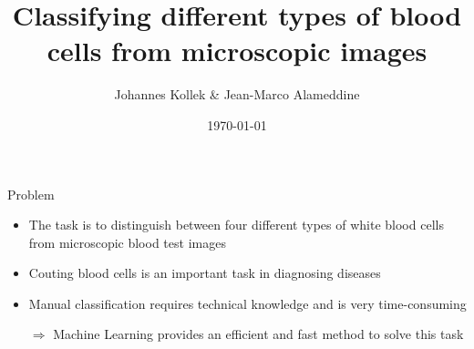 \documentclass[15pt]{beamer}
\title{Classifying different types of blood cells from microscopic images}
\date{\today}
\author{Johannes Kollek \& Jean-Marco Alameddine}
\institute{Machine Learning for Physicists - TU Dortmund}
\newcommand{\themename}{\textbf{\textsc{metropolis}}\xspace}
\begin{document}
\maketitle


%








\begin{frame}{Problem}
    \begin{itemize}
      \setlength\itemsep{1em}
      \item The task is to distinguish between four different types of white blood cells from microscopic blood test images
      \item Couting blood cells is an important task in diagnosing diseases
      \item Manual classification requires technical knowledge and is very time-consuming
      \item[$\Rightarrow$] Machine Learning provides an efficient and fast method to solve this task
    \end{itemize}
\end{frame}
\end{document}

